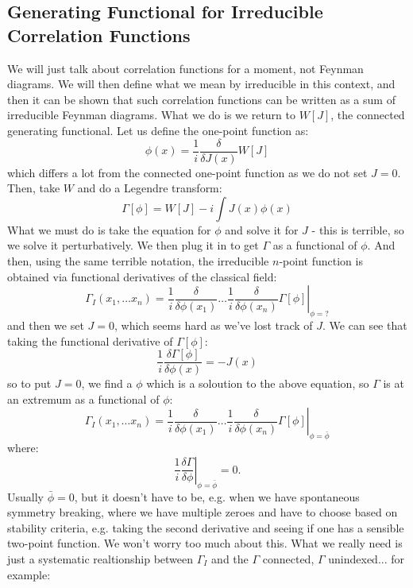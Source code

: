 \subsection{Generating Functional for Irreducible Correlation Functions}
We will just talk about correlation functions for a moment, not Feynman diagrams. We will then define what we mean by irreducible in this context, and then it can be shown that such correlation functions can be written as a sum of irreducible Feynman diagrams. What we do is we return to $W[J]$, the connected generating functional. Let us define the one-point function as:
\begin{equation}
    \phi(x) = \frac{1}{i}\frac{\delta}{\delta J(x)}W[J]
\end{equation}
which differs a lot from the connected one-point function as we do not set $J = 0$. Then, take $W$ and do a Legendre transform:
\begin{equation}
    \Gamma[\phi] = W[J] - i\int J(x)\phi(x)
\end{equation}
What we must do is take the equation for $\phi$ and solve it for $J$ - this is terrible, so we solve it perturbatively. We then plug it in to get $\Gamma$ as a functional of $\phi$. And then, using the same terrible notation, the irreducible $n$-point function is obtained via functional derivatives of the classical field:
\begin{equation}
    \Gamma_I(x_1, \ldots x_n) = \left.\frac{1}{i}\frac{\delta}{\delta \phi(x_1)} \ldots \frac{1}{i}\frac{\delta}{\delta \phi(x_n)}\Gamma[\phi]\right|_{\phi = ?}
\end{equation}
and then we set $J = 0$, which seems hard as we've lost track of $J$. We can see that taking the functional derivative of $\Gamma[\phi]$:
\begin{equation}
    \frac{1}{i}\frac{\delta \Gamma[\phi]}{\delta \phi(x)} = -J(x)
\end{equation}
so to put $J = 0$, we find a $\phi$ which is a soloution to the above equation, so $\Gamma$ is at an extremum as a functional of $\phi$:
\begin{equation}
    \Gamma_I(x_1, \ldots x_n) = \left.\frac{1}{i}\frac{\delta}{\delta \phi(x_1)} \ldots \frac{1}{i}\frac{\delta}{\delta \phi(x_n)}\Gamma[\phi]\right|_{\phi = \bar{\phi}}
\end{equation}
where:
\begin{equation}
   \left. \frac{1}{i}\frac{\delta \Gamma}{\delta \phi}\right|_{\phi = \bar{\phi}} = 0.
\end{equation}
Usually $\bar{\phi} = 0$, but it doesn't have to be, e.g. when we have spontaneous symmetry breaking, where we have multiple zeroes and have to choose based on stability criteria, e.g. taking the second derivative and seeing if one has a sensible two-point function. We won't worry too much about this. What we really need is just a systematic realtionship between $\Gamma_I$ and the $\Gamma$ connected, $\Gamma$ unindexed... for example:

